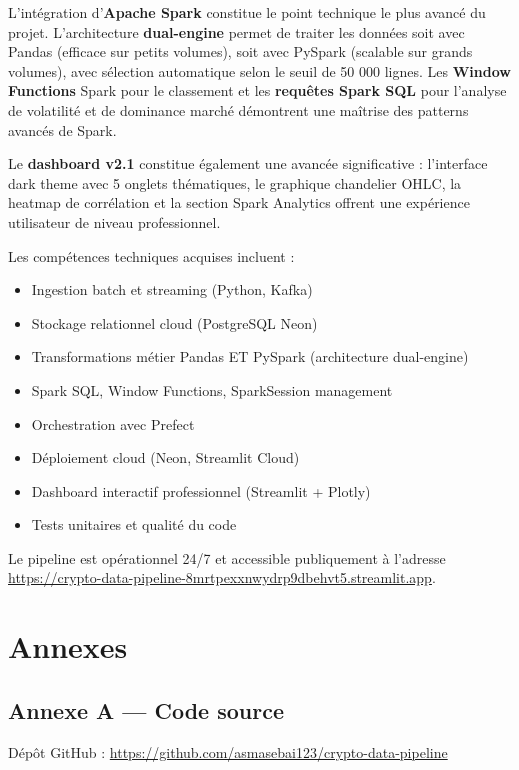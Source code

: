 \documentclass[12pt,a4paper]{article}
\begin{document}
L'intégration d'\textbf{Apache Spark} constitue le point technique le plus avancé du projet. L'architecture \textbf{dual-engine} permet de traiter les données soit avec Pandas (efficace sur petits volumes), soit avec PySpark (scalable sur grands volumes), avec sélection automatique selon le seuil de 50 000 lignes. Les \textbf{Window Functions} Spark pour le classement et les \textbf{requêtes Spark SQL} pour l'analyse de volatilité et de dominance marché démontrent une maîtrise des patterns avancés de Spark.

Le \textbf{dashboard v2.1} constitue également une avancée significative : l'interface dark theme avec 5 onglets thématiques, le graphique chandelier OHLC, la heatmap de corrélation et la section Spark Analytics offrent une expérience utilisateur de niveau professionnel.

Les compétences techniques acquises incluent :
\begin{itemize}[noitemsep]
    \item Ingestion batch et streaming (Python, Kafka)
    \item Stockage relationnel cloud (PostgreSQL Neon)
    \item Transformations métier Pandas ET PySpark (architecture dual-engine)
    \item Spark SQL, Window Functions, SparkSession management
    \item Orchestration avec Prefect
    \item Déploiement cloud (Neon, Streamlit Cloud)
    \item Dashboard interactif professionnel (Streamlit + Plotly)
    \item Tests unitaires et qualité du code
\end{itemize}

Le pipeline est opérationnel 24/7 et accessible publiquement à l'adresse \\
\url{https://crypto-data-pipeline-8mrtpexxnwydrp9dbehvt5.streamlit.app}.

\section*{Annexes}

\subsection*{Annexe A — Code source}
Dépôt GitHub : \url{https://github.com/asmasebai123/crypto-data-pipeline}
\end{document}
